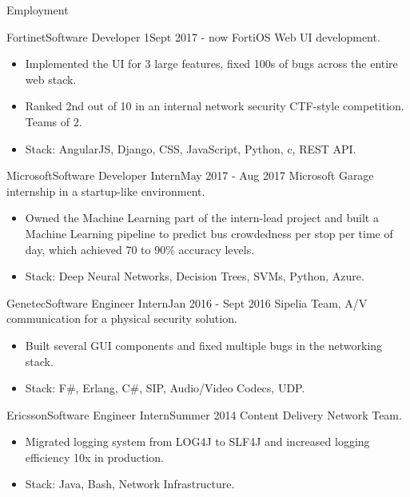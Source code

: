 \documentclass[]{muchicv}
\begin{document}
	\makeheader
	
	\begin{cvsection}{Employment}
		\begin{cvsubsection}{Fortinet}{Software Developer 1}{Sept 2017 - now}
			FortiOS Web UI development.
			\begin{itemize}
				\item Implemented the UI for 3 large features, fixed 100s of bugs across the entire web stack.
				\item Ranked 2nd out of 10 in an internal network security CTF-style competition. Teams of 2.
				\item Stack: AngularJS, Django, CSS, JavaScript, Python, c, REST API.
			\end{itemize}
		\end{cvsubsection}
		
		\begin{cvsubsection}{Microsoft}{Software Developer Intern}{May 2017 - Aug 2017}
			Microsoft Garage internship in a startup-like environment.
			\begin{itemize}
				\item Owned the Machine Learning part of the intern-lead project and built a Machine Learning pipeline to predict bus crowdedness per stop per time of day, which achieved 70 to 90\% accuracy levels.
				\item Stack: Deep Neural Networks, Decision Trees, SVMs, Python, Azure.
			\end{itemize}
		\end{cvsubsection}
		
		\begin{cvsubsection}{Genetec}{Software Engineer Intern}{Jan 2016 - Sept 2016}
			Sipelia Team, A/V communication for a physical security solution.
			\begin{itemize}
				\item Built several GUI components and fixed multiple bugs in the networking stack.
				\item Stack: F\#, Erlang, C\#, SIP, Audio/Video Codecs, UDP.
			\end{itemize}
		\end{cvsubsection}
		
		\begin{cvsubsection}{Ericsson}{Software Engineer Intern}{Summer 2014}
			Content Delivery Network Team.
			\begin{itemize}
				\item Migrated logging system from LOG4J to SLF4J and increased logging efficiency 10x in production.
				\item Stack: Java, Bash, Network Infrastructure.
			\end{itemize}
		\end{cvsubsection}
	\end{cvsection}
	
\end{document}
